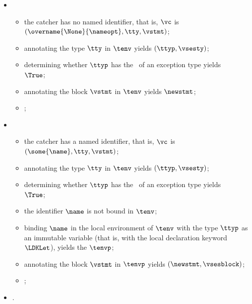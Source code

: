 \ProseParagraph
\OneApplies
\begin{itemize}
  \item {}
  \begin{itemize}
    \item the catcher has no named identifier, that is, $\vc$ is $(\overname{\None}{\nameopt}, \tty, \vstmt)$;
    \item annotating the type $\tty$ in $\tenv$ yields $(\ttyp, \vsesty)$\ProseOrTypeError;
    \item determining whether $\ttyp$ has the \structureterm\ of an exception type yields \\ $\True$\ProseOrTypeError;
    \item annotating the block $\vstmt$ in $\tenv$ yields $\newstmt$;
    \item \Proseeqdef{$\newcatcher$}{$(\overname{\None}{\nameopt}, \ttyp, \newstmt)$};
  \end{itemize}

  \item {}
  \begin{itemize}
    \item the catcher has a named identifier, that is, $\vc$ is $(\some{\name}, \tty, \vstmt)$;
    \item annotating the type $\tty$ in $\tenv$ yields $(\ttyp, \vsesty)$\ProseOrTypeError;
    \item determining whether $\ttyp$ has the \structureterm\ of an exception type yields \\ $\True$\ProseOrTypeError;
    \item the identifier $\name$ is not bound in $\tenv$;
    \item binding $\name$ in the local environment of $\tenv$ with the type $\ttyp$ as an immutable variable
          (that is, with the local declaration keyword $\LDKLet$), yields the \staticenvironmentterm{} $\tenvp$;
    \item annotating the block $\vstmt$ in $\tenvp$ yields $(\newstmt, \vsesblock)$;
    \item \Proseeqdef{$\newcatcher$}{$(\overname{\some{\name}}{\nameopt}, \ttyp, \newstmt)$};
  \end{itemize}
  \item {}.
\end{itemize}

